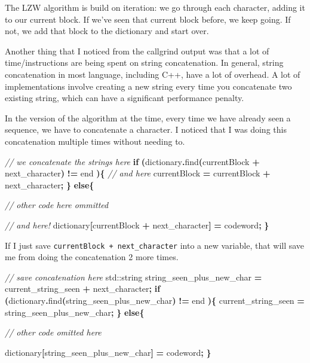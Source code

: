 \documentclass[12pt,twoside]{reedthesis}
\newenvironment{Shaded}{\begin{snugshade}}{\end{snugshade}}
\newcommand{\BuiltInTok}[1]{#1}
\newcommand{\CommentTok}[1]{\textcolor[rgb]{0.56,0.35,0.01}{\textit{#1}}}
\newcommand{\ControlFlowTok}[1]{\textcolor[rgb]{0.13,0.29,0.53}{\textbf{#1}}}
\newcommand{\NormalTok}[1]{#1}
\newcommand{\OperatorTok}[1]{\textcolor[rgb]{0.81,0.36,0.00}{\textbf{#1}}}
\begin{document}
The LZW algorithm is build on iteration: we go through each character, adding it to our current block. If we've seen that current block before, we keep going. If not, we add that block to the dictionary and start over.

Another thing that I noticed from the callgrind output was that a lot of time/instructions are being spent on string concatenation. In general, string concatenation in most language, including C++, have a lot of overhead. A lot of implementations involve creating a new string every time you concatenate two existing string, which can have a significant performance penalty.

In the version of the algorithm at the time, every time we have already seen a sequence, we have to concatenate a character. I noticed that I was doing this concatenation multiple times without needing to.
\begin{Shaded}
\begin{Highlighting}[]
\CommentTok{// we concatenate the strings here}
\ControlFlowTok{if} \OperatorTok{(}\NormalTok{dictionary}\OperatorTok{.}\NormalTok{find}\OperatorTok{(}\NormalTok{currentBlock }\OperatorTok{+}\NormalTok{ next\_character}\OperatorTok{)} \OperatorTok{!=}\NormalTok{ end }\OperatorTok{)\{}
    \CommentTok{// and here}
\NormalTok{    currentBlock }\OperatorTok{=}\NormalTok{ currentBlock }\OperatorTok{+}\NormalTok{ next\_character}\OperatorTok{;}
\OperatorTok{\}}
\ControlFlowTok{else}\OperatorTok{\{}

    \CommentTok{// other code here ommitted}


    \CommentTok{// and here! }
\NormalTok{    dictionary}\OperatorTok{[}\NormalTok{currentBlock }\OperatorTok{+}\NormalTok{ next\_character}\OperatorTok{]} \OperatorTok{=}\NormalTok{ codeword}\OperatorTok{;}
\OperatorTok{\}}
\end{Highlighting}
\end{Shaded}
If I just save \texttt{currentBlock\ +\ next\_character} into a new variable, that will save me from doing the concatenation 2 more times.
\begin{Shaded}
\begin{Highlighting}[]
\CommentTok{// save concatenation here}
\BuiltInTok{std::}\NormalTok{string}\OperatorTok{ }\NormalTok{string\_seen\_plus\_new\_char }\OperatorTok{=}\NormalTok{ current\_string\_seen }\OperatorTok{+}\NormalTok{ next\_character}\OperatorTok{;}
\ControlFlowTok{if} \OperatorTok{(}\NormalTok{dictionary}\OperatorTok{.}\NormalTok{find}\OperatorTok{(}\NormalTok{string\_seen\_plus\_new\_char}\OperatorTok{)} \OperatorTok{!=}\NormalTok{ end }\OperatorTok{)\{}
\NormalTok{    current\_string\_seen }\OperatorTok{=}\NormalTok{ string\_seen\_plus\_new\_char}\OperatorTok{;}
\OperatorTok{\}}
\ControlFlowTok{else}\OperatorTok{\{}

\CommentTok{// other code omitted here}

\NormalTok{    dictionary}\OperatorTok{[}\NormalTok{string\_seen\_plus\_new\_char}\OperatorTok{]} \OperatorTok{=}\NormalTok{ codeword}\OperatorTok{;}
\OperatorTok{\}}
\end{Highlighting}
\end{Shaded}
\end{document}
